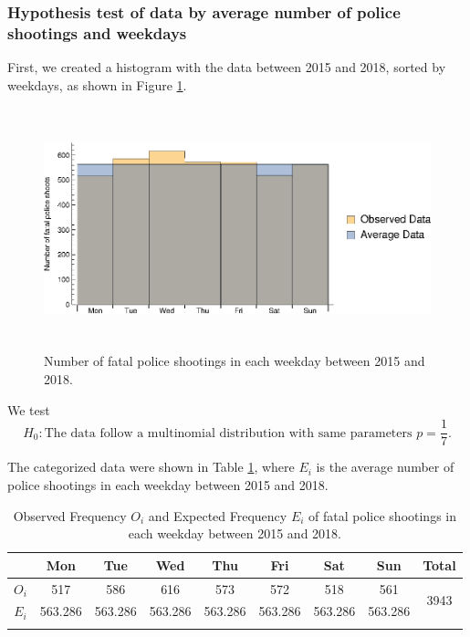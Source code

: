 \documentclass[conf]{new-aiaa}
\begin{document}
\subsubsection{Hypothesis test of data by average number of police shootings and weekdays}

First, we created a histogram with the data between 2015 and 2018, sorted by weekdays, as shown in Figure \ref{fig:q4-day}. \medskip

\begin{figure}[!htbp]
\centering
\includegraphics[height=7cm]{q4/q4-day.eps}
\caption{Number of fatal police shootings in each weekday between 2015 and 2018.}
\label{fig:q4-day}
\end{figure}

We test
$$H_0: \text{The data follow a multinomial distribution with same parameters }p=\frac{1}{7}.$$

The categorized data were shown in Table \ref{tab:q4-day}, where $E_i$ is the average number of police shootings in each weekday between 2015 and 2018. \medskip

\begin{table}[!htbp]
\centering
\begin{tabular}{c|ccccccc|c}
\toprule 
\toprule
 & Mon & Tue & Wed & Thu & Fri & Sat & Sun & Total \\
\hline
$O_i$ & 517 & 586 & 616 & 573 & 572 & 518 & 561 & \multirow{2}{*}{3943}\\
$E_i$ & 563.286 & 563.286 & 563.286 & 563.286 & 563.286 & 563.286 & 563.286 & \\
\bottomrule 
\bottomrule\noalign{\bigskip}
\end{tabular}
\caption{Observed Frequency $O_i$ and Expected Frequency $E_i$ of fatal police shootings in each weekday between 2015 and 2018.}
\label{tab:q4-day}
\end{table}
\end{document}
